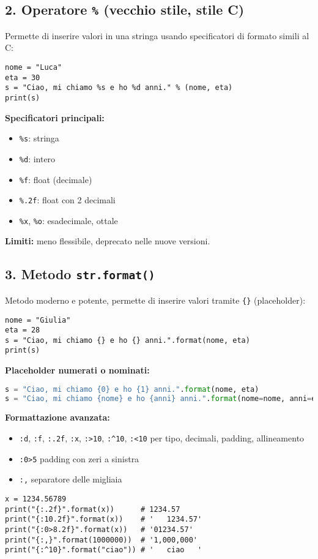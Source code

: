 \documentclass[a4paper,12pt]{article}
\begin{document}
\subsection*{2. Operatore \texttt{\%} (vecchio stile, stile C)}
Permette di inserire valori in una stringa usando specificatori di formato simili al C:
\begin{lstlisting}
nome = "Luca"
eta = 30
s = "Ciao, mi chiamo %s e ho %d anni." % (nome, eta)
print(s)
\end{lstlisting}
\textbf{Specificatori principali:}
\begin{itemize}
    \item \texttt{\%s}: stringa
    \item \texttt{\%d}: intero
    \item \texttt{\%f}: float (decimale)
    \item \texttt{\%.2f}: float con 2 decimali
    \item \texttt{\%x}, \texttt{\%o}: esadecimale, ottale
\end{itemize}
\textbf{Limiti:} meno flessibile, deprecato nelle nuove versioni.

\subsection*{3. Metodo \texttt{str.format()}}
Metodo moderno e potente, permette di inserire valori tramite \texttt{\{\}} (placeholder):
\begin{lstlisting}
nome = "Giulia"
eta = 28
s = "Ciao, mi chiamo {} e ho {} anni.".format(nome, eta)
print(s)
\end{lstlisting}
\textbf{Placeholder numerati o nominati:}
\begin{lstlisting}[language=Python, basicstyle=\ttfamily\footnotesize, breaklines=true, frame=single]
s = "Ciao, mi chiamo {0} e ho {1} anni.".format(nome, eta)
s = "Ciao, mi chiamo {nome} e ho {anni} anni.".format(nome=nome, anni=eta)
\end{lstlisting}

\textbf{Formattazione avanzata:}
\begin{itemize}
    \item \verb|:d|, \verb|:f|, \verb|:.2f|, \verb|:x|, \verb|:>10|, \verb|:^10|, \verb|:<10| per tipo, decimali, padding, allineamento
    \item \verb|:0>5| padding con zeri a sinistra
    \item \verb|:,| separatore delle migliaia
\end{itemize}
\begin{lstlisting}
x = 1234.56789
print("{:.2f}".format(x))      # 1234.57
print("{:10.2f}".format(x))    # '   1234.57'
print("{:0>8.2f}".format(x))   # '01234.57'
print("{:,}".format(1000000))  # '1,000,000'
print("{:^10}".format("ciao")) # '   ciao   '
\end{lstlisting}
\end{document}
